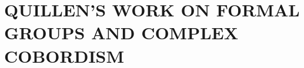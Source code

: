 \documentclass[../main]{subfiles}
\begin{document}
\part{QUILLEN'S WORK ON FORMAL GROUPS AND COMPLEX COBORDISM}

\setcounter{chapter}{-1}%


















\nocite{lazard}
\printbibliography
\end{document}
